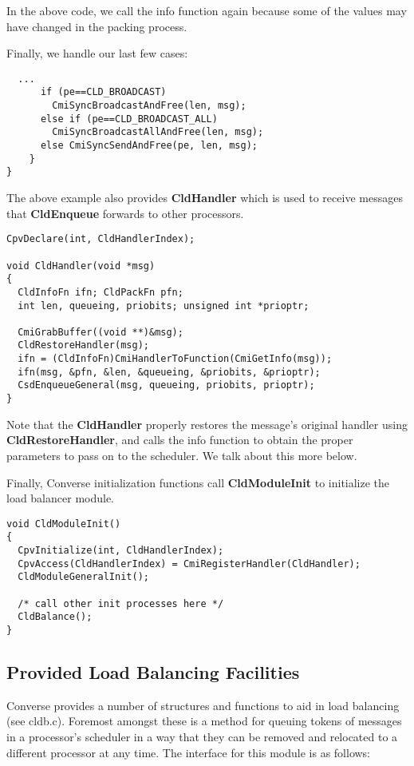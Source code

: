 In the above code, we call the info function again because some of the
values may have changed in the packing process.  

Finally, we handle our last few cases:

\begin{verbatim}
  ...
      if (pe==CLD_BROADCAST) 
        CmiSyncBroadcastAndFree(len, msg);
      else if (pe==CLD_BROADCAST_ALL)
        CmiSyncBroadcastAllAndFree(len, msg);
      else CmiSyncSendAndFree(pe, len, msg);
    }
}
\end{verbatim}

The above example also provides {\bf CldHandler} which is used to
receive messages that {\bf CldEnqueue} forwards to other processors.

\begin{verbatim}
CpvDeclare(int, CldHandlerIndex);

void CldHandler(void *msg)
{
  CldInfoFn ifn; CldPackFn pfn;
  int len, queueing, priobits; unsigned int *prioptr;
  
  CmiGrabBuffer((void **)&msg);
  CldRestoreHandler(msg);
  ifn = (CldInfoFn)CmiHandlerToFunction(CmiGetInfo(msg));
  ifn(msg, &pfn, &len, &queueing, &priobits, &prioptr);
  CsdEnqueueGeneral(msg, queueing, priobits, prioptr);
}
\end{verbatim}

Note that the {\bf CldHandler} properly restores the message's original
handler using {\bf CldRestoreHandler}, and calls the info function to obtain
the proper parameters to pass on to the scheduler.  We talk about this
more below. 

Finally, Converse initialization functions call {\bf CldModuleInit} to
initialize the load balancer module.

\begin{verbatim}
void CldModuleInit()
{
  CpvInitialize(int, CldHandlerIndex);
  CpvAccess(CldHandlerIndex) = CmiRegisterHandler(CldHandler);
  CldModuleGeneralInit();

  /* call other init processes here */
  CldBalance();
}
\end{verbatim}


\subsection{Provided Load Balancing Facilities}

Converse provides a number of structures and functions to aid in load
balancing (see cldb.c).  Foremost amongst these is a method for
queuing tokens of messages in a processor's scheduler in a way that
they can be removed and relocated to a different processor at any
time. The interface for this module is as follows:

